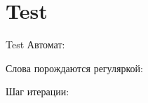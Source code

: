 \section{Test}
\begin{frame}{Test}
    Автомат:


    Слова порождаются регуляркой:

    Шаг итерации:


\end{frame}
